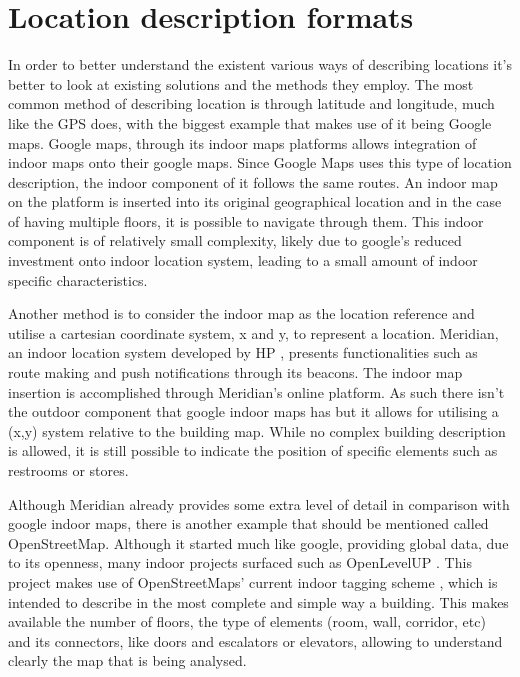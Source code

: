 \section{Location description formats} 
\label{sec:description} 
 
 
In order to better understand the existent various ways of describing locations it's better to look at existing solutions and the methods they employ. The most common method of describing location is through latitude and longitude, much like the \ac{GPS} does, with the biggest example that makes use of it being Google maps. Google maps, through its indoor maps platforms \cite{googlemaps} allows integration of indoor maps onto their google maps. Since Google Maps uses this type of location description, the indoor component of it follows the same routes. An indoor map on the platform is inserted into its original geographical location and in the case of having multiple floors, it is possible to navigate through them. This indoor component is of relatively small complexity, likely due to google's reduced investment onto indoor location system, leading to a small amount of indoor specific characteristics.  
 
 
Another method is to consider the indoor map as the location reference and utilise a cartesian coordinate system, x and y, to represent a location. Meridian, an indoor location system developed by HP \cite{meridian}, presents functionalities such as route making and push notifications through its beacons. The indoor map insertion is accomplished through Meridian's online platform. As such there isn't the outdoor component that google indoor maps has but it allows for utilising a (x,y) system relative to the building map. While no complex building description is allowed, it is still possible to indicate the position of specific elements such as restrooms or stores. 
 
 
Although Meridian already provides some extra level of detail in comparison with google indoor maps, there is another example that should be mentioned called OpenStreetMap. Although it started much like google, providing global data, due to its openness, many indoor projects surfaced such as OpenLevelUP \cite{openlevel}. This project makes use of OpenStreetMaps' current indoor tagging scheme \cite{opentagging}, which is intended to describe in the most complete and simple way a building. This makes available the number of floors, the type of elements (room, wall, corridor, etc) and its connectors, like doors and escalators or elevators, allowing to understand clearly the map that is being analysed. 
 
 
 